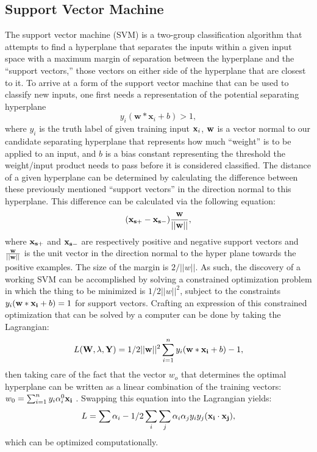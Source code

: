 \subsection{Support Vector Machine}
The support vector machine (SVM) is a two-group classification algorithm that
attempts to find a hyperplane that separates the inputs within a given input
space with a maximum margin of separation between the hyperplane and the
``support vectors,'' those vectors on either side of the hyperplane
that are closest to it. To arrive at a form of the support vector machine that
can be used to classify new inputs, one first needs a representation of the
potential separating hyperplane $$y_i(\mathbf{w}*\mathbf{x}_i + b) > 1,$$ where
$y_i$ is the truth label of given training input $\bold{x}_i$, $\bold{w}$ is a vector
normal to our candidate separating hyperplane that represents how much
``weight'' is to be applied to an input, and $b$ is a bias constant representing
the threshold the weight/input product needs to pass before it is considered
classified. The distance of a given hyperplane can be determined by calculating
the difference between these previously mentioned ``support vectors'' in the
direction normal to this hyperplane. This difference can be calculated via the
following equation:
$$(\bold{x_{s+}}-\bold{x_{s-}})\bold{\frac{w}{||w||}},$$ where $\bold{x_{s+}}$
and $\bold{x_{s-}}$ are respectively positive and negative support vectors and
$\bold{\frac{w}{||w||}}$ is the unit vector in the direction normal to the hyper
plane towards the positive examples. The size of the margin is $2/||w||$. As
such, the discovery of a working SVM can be accomplished by solving a constrained
optimization problem in which the thing to be minimized is $1/2||w||^2$, subject
to the constraints $y_i(\bold{w}*\bold{x_i} + b) = 1$ for support vectors.
Crafting an expression of this constrained optimization that can be solved by a
computer can be done by taking the Lagrangian:
$$L(\bold{W},\bold{\lambda},\bold{Y}) = 1/2||\bold{w}||^2 \sum_{i=1}^{n}y_i(\bold{w}*\bold{x_i}+b)-1,$$
then taking care of the fact that the vector $w_o$ that determines the optimal
hyperplane can be written as a linear combination of the training vectors:
$w_{0}=\sum_{i=1}^{n}y_{i}\alpha_{i}^{0}\bold{x_i}$ \cite{Vapnik}. Swapping this
equation into the Lagrangian yields:
$$L = \sum \alpha_{i} - 1/2 \sum_{i}\sum_{j}\alpha_{i}\alpha_{j}y_{i}y_{j}(\bold{x_i}\cdot\bold{x_j}),$$
which can be optimized computationally.

